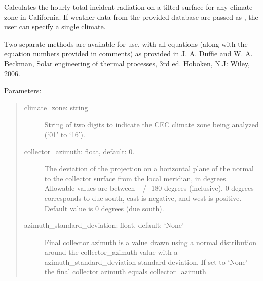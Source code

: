 \documentclass[letterpaper,10pt,english,openany]{sphinxmanual}
\begin{document}
\begin{fulllineitems}
\begin{fulllineitems}
\end{fulllineitems}


\begin{fulllineitems}
\label{\detokenize{source/mswh.system:mswh.system.source_and_sink.SourceAndSink.irradiation_and_water_main}}
Calculates the hourly total incident radiation on a tilted surface
for any climate zone in California. If weather data from the provided
database are passed as , the user can specify a single
climate.

Two separate methods are available for use, with all equations
(along with the equation numbers provided in comments) as provided in
J. A. Duffie and W. A. Beckman, Solar engineering of thermal
processes, 3rd ed. Hoboken, N.J: Wiley, 2006.

Parameters:
\begin{quote}
\begin{description}
\item[{climate\_zone: string}] \leavevmode
String of two digits to indicate the CEC climate zone
being analyzed (‘01’ to ‘16’).

\item[{collector\_azimuth: float, default: 0.}] \leavevmode
The deviation of the projection on a horizontal
plane of the normal to the collector surface from
the local meridian, in degrees.  Allowable values
are between +/- 180 degrees (inclusive).  0 degrees
corresponds to due south, east is negative, and west
is positive.  Default value is 0 degrees (due south).

\item[{azimuth\_standard\_deviation: float, default: ‘None’}] \leavevmode
Final collector azimuth is a value drawn using a normal
distribution around the collector\_azimuth value
with a azimuth\_standard\_deviation standard deviation.
If set to ‘None’ the final collector azimuth
equals collector\_azimuth


\end{description}
\end{quote}
\end{fulllineitems}
\end{fulllineitems}
\end{document}

